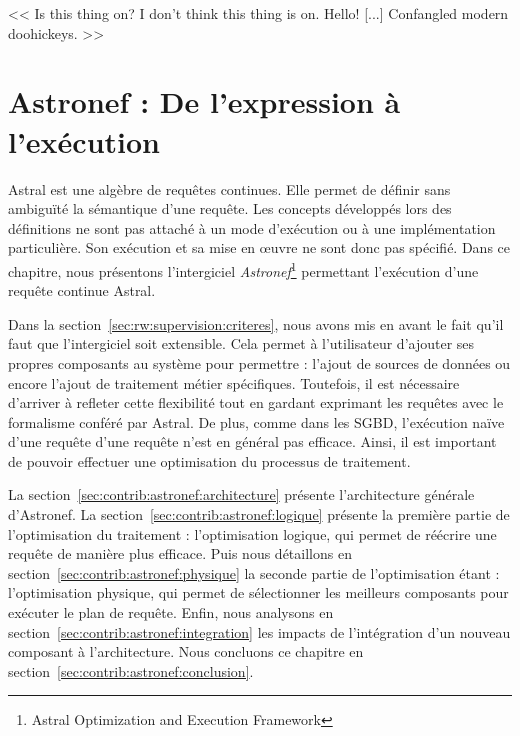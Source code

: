 \begin{savequote}[6cm]
<< Is this thing on? I don't think this thing is on. Hello! [...] Confangled modern doohickeys. >>
\end{savequote}

\chapter{Astronef : De l'expression à l'exécution}\label{chap:contrib:astronef}
\chaptertoc

Astral est une algèbre de requêtes continues. Elle permet de définir sans ambiguïté la sémantique d'une requête. Les concepts développés lors des définitions ne sont pas attaché à un mode d'exécution ou à une implémentation particulière. Son exécution et sa mise en œuvre ne sont donc pas spécifié. Dans ce chapitre, nous présentons l'intergiciel \textit{Astronef}\footnote{Astral Optimization and Execution Framework} permettant l'exécution d'une requête continue Astral.

Dans la section~\ref{sec:rw:supervision:criteres}, nous avons mis en avant le fait qu'il faut que l'intergiciel soit extensible. Cela permet à l'utilisateur d'ajouter ses propres composants au système pour permettre : l'ajout de sources de données ou encore l'ajout de traitement métier spécifiques. Toutefois, il est nécessaire d'arriver à refleter cette flexibilité tout en gardant exprimant les requêtes avec le formalisme conféré par Astral. De plus, comme dans les SGBD, l'exécution naïve d'une requête d'une requête n'est en général pas efficace. Ainsi, il est important de pouvoir effectuer une optimisation du processus de traitement.

La section~\ref{sec:contrib:astronef:architecture} présente l'architecture générale d'Astronef. La section~\ref{sec:contrib:astronef:logique} présente la première partie de l'optimisation du traitement : l'optimisation logique, qui permet de réécrire une requête de manière plus efficace. Puis nous détaillons en section~\ref{sec:contrib:astronef:physique} la seconde partie de l'optimisation étant : l'optimisation physique, qui permet de sélectionner les meilleurs composants pour exécuter le plan de requête. Enfin, nous analysons en section~\ref{sec:contrib:astronef:integration} les impacts de l'intégration d'un nouveau composant à l'architecture. Nous concluons ce chapitre en section~\ref{sec:contrib:astronef:conclusion}.

\lstset{language=PrologAstral}





